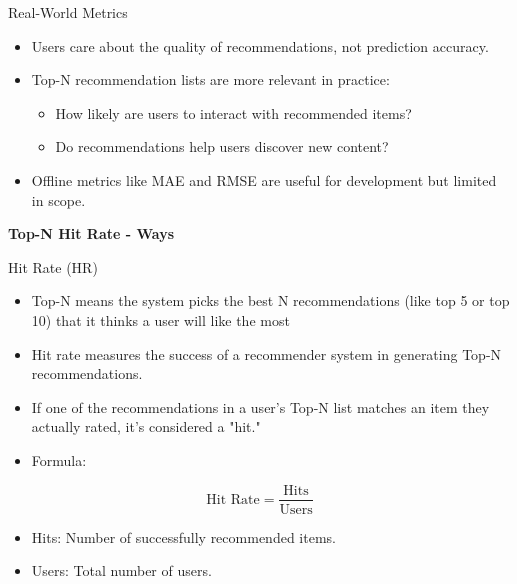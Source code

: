 \documentclass{beamer}
\begin{document}
\begin{frame}{Real-World Metrics}
\begin{itemize}
    \item Users care about the quality of recommendations, not prediction accuracy.
    \item Top-N recommendation lists are more relevant in practice:
    \begin{itemize}
        \item How likely are users to interact with recommended items?
        \item Do recommendations help users discover new content?
    \end{itemize}
    \item Offline metrics like MAE and RMSE are useful for development but limited in scope.
\end{itemize}
\end{frame}

\begin{frame}[plain]
    \begin{center}
        {\LARGE \textbf{Top-N Hit Rate - Ways}}
    \end{center}
\end{frame}

\begin{frame}{Hit Rate (HR)}
\begin{itemize}
    \item Top-N means the system picks the best N recommendations (like top 5 or top 10) that it thinks a user will like the most
    \item Hit rate measures the success of a recommender system in generating Top-N recommendations.
    \item If one of the recommendations in a user’s Top-N list matches an item they actually rated, it’s considered a "hit."
    \item Formula:
\end{itemize}
\[
\text{Hit Rate} = \frac{\text{Hits}}{\text{Users}}
\]
\begin{itemize}
    \item Hits: Number of successfully recommended items.
    \item Users: Total number of users.
\end{itemize}
\end{frame}
\end{document}
